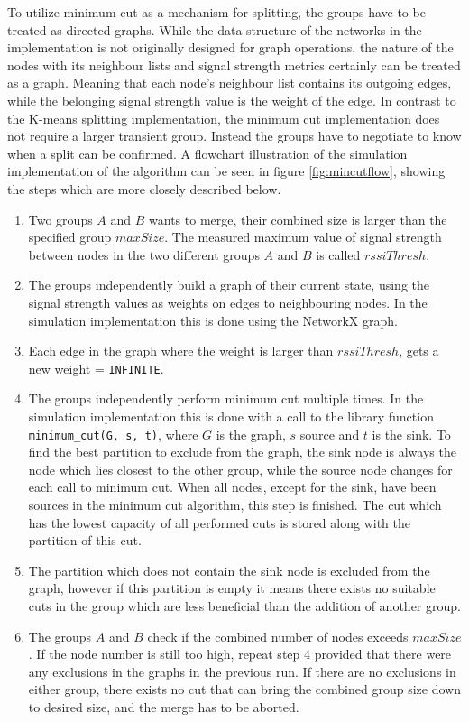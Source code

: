 To utilize minimum cut as a mechanism for splitting, the groups have to be treated as directed graphs. While the data structure of the networks in the implementation is not
originally designed for graph operations, the nature of the nodes with its neighbour lists and signal strength metrics certainly can be treated as a graph. Meaning that each node's neighbour list contains
its outgoing edges, while the belonging signal strength value is the weight of the edge. In contrast to the K-means splitting implementation, the minimum cut implementation does not require
a larger transient group. Instead the groups have to negotiate to know when a split can be confirmed. A flowchart illustration of the simulation implementation of the algorithm can be seen in figure \ref{fig:mincutflow}, showing the steps which are more closely described below. 

\begin{enumerate}
	\item Two groups $A$ and $B$ wants to merge, their combined size is larger than the specified group $maxSize$. The measured maximum value of signal strength between nodes in the two different
		groups $A$ and $B$ is called $rssiThresh$. 
	\item The groups independently build a graph of their current state, using the signal strength values as weights on edges to neighbouring nodes. In the simulation implementation this is done using the NetworkX graph.
	\item Each edge in the graph where the weight is larger than  $rssiThresh$, gets a new weight = \verb|INFINITE|.
	\item The groups independently perform minimum cut multiple times. In the simulation implementation this is done with a call to the library function \newline \verb|minimum_cut(G, s, t)|,
		where $G$ is the graph, $s$ source and $t$ is the sink. To find the best partition to exclude from the graph, the  sink node is always the node which lies closest to the other group,
		while the source node changes for each call to minimum cut. When all nodes, except for the sink, have been sources in the minimum cut algorithm, this step is finished. The cut
		which has the lowest capacity of all performed cuts is stored along with the partition of this cut. 
	\item The partition which does not contain the sink node is excluded from the graph, however if this partition is empty it means there exists no suitable cuts in the group which are less beneficial than the addition of another group. 
	\item The groups $A$ and $B$ check if the combined number of nodes exceeds $maxSize$. If the node number is still too high, repeat step 4 provided that there were any 
		exclusions in the graphs in the previous run. If there are no exclusions in either group, there exists no cut that can bring the combined group size down to desired size, and the
		merge has to be aborted. 
\end{enumerate}

